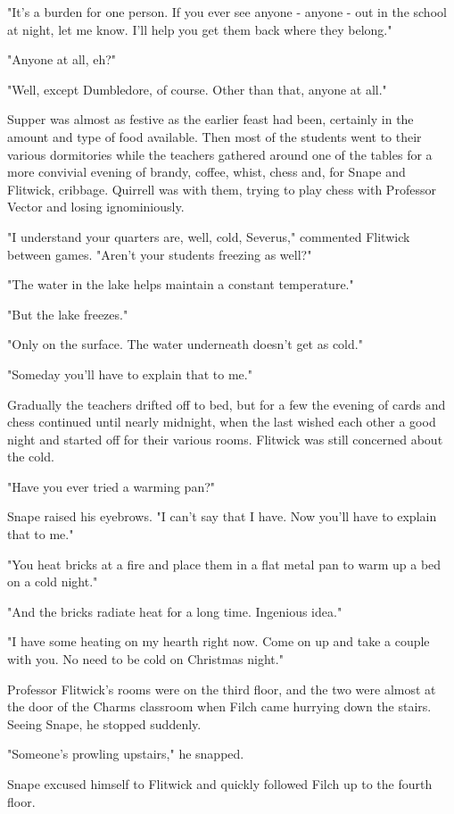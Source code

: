 "It's a burden for one person. If you ever see anyone - anyone - out in the school at night, let me know. I'll help you get them back where they belong."

"Anyone at all, eh?"

"Well, except Dumbledore, of course. Other than that, anyone at all."

Supper was almost as festive as the earlier feast had been, certainly in the amount and type of food available. Then most of the students went to their various dormitories while the teachers gathered around one of the tables for a more convivial evening of brandy, coffee, whist, chess and, for Snape and Flitwick, cribbage. Quirrell was with them, trying to play chess with Professor Vector and losing ignominiously.

"I understand your quarters are, well, cold, Severus," commented Flitwick between games. "Aren't your students freezing as well?"

"The water in the lake helps maintain a constant temperature."

"But the lake freezes."

"Only on the surface. The water underneath doesn't get as cold."

"Someday you'll have to explain that to me."

Gradually the teachers drifted off to bed, but for a few the evening of cards and chess continued until nearly midnight, when the last wished each other a good night and started off for their various rooms. Flitwick was still concerned about the cold.

"Have you ever tried a warming pan?"

Snape raised his eyebrows. "I can't say that I have. Now you'll have to explain that to me."

"You heat bricks at a fire and place them in a flat metal pan to warm up a bed on a cold night."

"And the bricks radiate heat for a long time. Ingenious idea."

"I have some heating on my hearth right now. Come on up and take a couple with you. No need to be cold on Christmas night."

Professor Flitwick's rooms were on the third floor, and the two were almost at the door of the Charms classroom when Filch came hurrying down the stairs. Seeing Snape, he stopped suddenly.

"Someone's prowling upstairs," he snapped.

Snape excused himself to Flitwick and quickly followed Filch up to the fourth floor.

